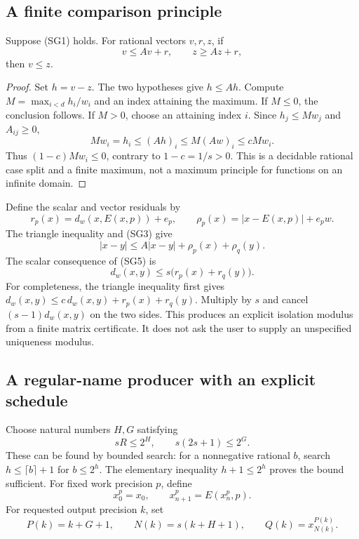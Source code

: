 \subsection{A finite comparison principle}

\begin{lemma}
\label{lem:weighted-maximum}
Suppose (SG1) holds.  For rational vectors $v,r,z$, if
\[
 v\le Av+r,\qquad z\ge Az+r,
\]
then $v\le z$.
\end{lemma}
\begin{proof}
Set $h=v-z$.  The two hypotheses give $h\le Ah$.
Compute $M=\max_{i<d}h_i/w_i$ and an index attaining the maximum.
If $M\le0$, the conclusion follows.  If $M>0$, choose an attaining
index $i$.  Since $h_j\le Mw_j$ and $A_{ij}\ge0$,
\[
 Mw_i=h_i\le(Ah)_i\le M(Aw)_i\le cMw_i.
\]
Thus $(1-c)Mw_i\le0$, contrary to $1-c=1/s>0$.
This is a decidable rational case split and a finite maximum, not a maximum
principle for functions on an infinite domain.
\end{proof}

Define the scalar and vector residuals by
\[
 r_p(x)=d_w(x,E(x,p))+e_p,\qquad
 \rho_p(x)=|x-E(x,p)|+e_pw.
\]
The triangle inequality and (SG3) give
\begin{equation}
 |x-y|\le A|x-y|+\rho_p(x)+\rho_q(y).             \tag{SG5}
\end{equation}
The scalar consequence of (SG5) is
\begin{equation}
 d_w(x,y)\le s\bigl(r_p(x)+r_q(y)\bigr).         \tag{SG6}
\end{equation}
For completeness, the triangle inequality first gives
$d_w(x,y)\le c\,d_w(x,y)+r_p(x)+r_q(y)$.
Multiply by $s$ and cancel $(s-1)d_w(x,y)$ on the two sides.
This produces an explicit isolation modulus from a finite matrix
certificate.  It does not ask the user to supply an unspecified uniqueness
modulus.

\subsection{A regular-name producer with an explicit schedule}

Choose natural numbers $H,G$ satisfying
\[
 sR\le2^H,\qquad s(2s+1)\le2^G.                 \tag{SG7}
\]
These can be found by bounded search: for a nonnegative rational $b$,
search $h\le\lceil b\rceil+1$ for $b\le2^h$.
The elementary inequality $h+1\le2^h$ proves the bound sufficient.
For fixed work precision $p$, define
\[
 x^p_0=x_0,\qquad x^p_{n+1}=E(x^p_n,p).
\]
For requested output precision $k$, set
\begin{equation}
 P(k)=k+G+1,\qquad N(k)=s(k+H+1),\qquad
 Q(k)=x^{P(k)}_{N(k)}.                           \tag{SG8}
\end{equation}

